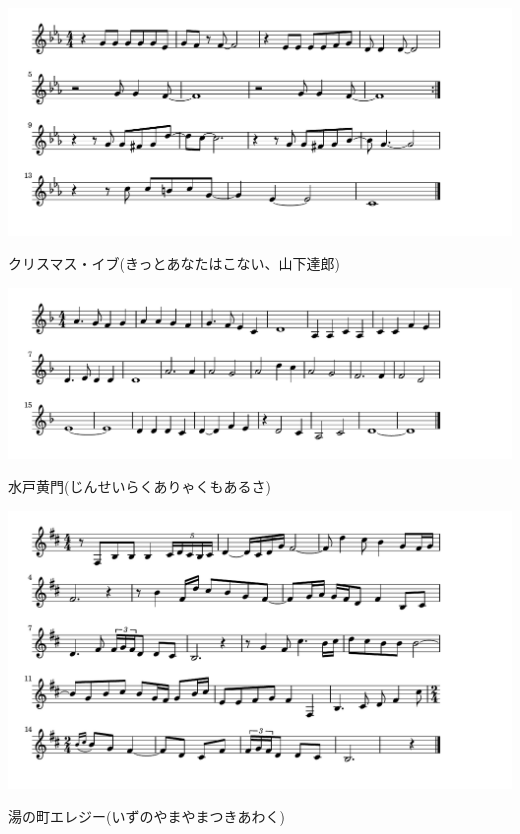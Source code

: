 \documentclass[a4paper]{ltjsarticle}
\begin{document}
\includegraphics[clip]{christmaseve_crop.pdf}

\vspace{-10mm} \hspace{10mm}
クリスマス・イブ(きっとあなたはこない、山下達郎)

\includegraphics[clip]{mitokomon_crop.pdf}

\vspace{-10mm} \hspace{10mm}
水戸黄門(じんせいらくありゃくもあるさ)

\includegraphics[clip]{yunomachielegy_crop.pdf}

\vspace{-10mm} \hspace{10mm}
湯の町エレジー(いずのやまやまつきあわく)
\end{document}
